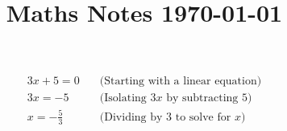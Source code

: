 \documentclass{article}
\title{Maths Notes \today}
\begin{document}
\maketitle
\begin{align}
	3x + 5 = 0 \quad &\text{(Starting with a linear equation)} \\ 
	3x = -5 \quad &\text{(Isolating } 3x \text{ by subtracting 5)} \\ 
	x = -\frac{5}{3} \quad &\text{(Dividing by 3 to solve for } x\text{)}
\end{align}
\end{document}
